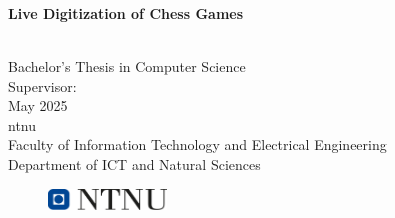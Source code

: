 \begin{titlepage}
\vspace*{1.5cm}

\noindent  \textcolor{gray}{\large 
\birgitte \\ 
\chris \\ 
\vegard} \\
\vspace{1cm}

\noindent \textbf{\Large Live Digitization of Chess Games} \\
\vspace{0.5cm}

 \\

\vspace{7cm}
\noindent Bachelor's Thesis in Computer Science \\
Supervisor: \saleh \\
May 2025 \\

\vspace{0.2cm}
\noindent \acrlong{ntnu} \\
Faculty of Information Technology and Electrical Engineering \\
Department of ICT and Natural Sciences \\

\begin{figure}[h]
    \includegraphics[width=0.28\textwidth]{figures/ntnu_basic.png}
\end{figure}
\end{titlepage}
\restoregeometry
\myemptypage %
